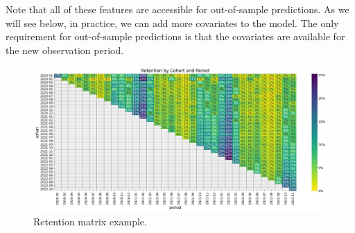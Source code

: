 \documentclass[11pt]{amsart}
\theoremstyle{definition}
\begin{document}
Note that all of these features are accessible for out-of-sample predictions.
As we will see below, in practice, we can add more covariates to the model.
The only requirement for out-of-sample predictions is that the covariates are available
for the new observation period. \\

\begin{figure}
    \centering
    \includegraphics[width=\textwidth]{images/revenue_retention_17_0.png}
    \caption{Retention matrix example.}
    \label{fig:retention_matrix}
\end{figure}
\end{document}
